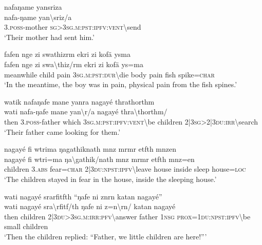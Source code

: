 \ea\label{ex:9:a2302}
nafaŋame yansriza\\
\gll nafa-ŋame	yan{\textbackslash}sriz/a\\
     3.\textsc{poss}-mother	\textsc{sg}>3\textsc{sg}.\textsc{m}:\textsc{pst}:\textsc{ipfv}:\textsc{vent}{\textbackslash}send\\
\glt `Their mother had sent him.'
\z

\ea\label{ex:9:a2303}
fafen nge zi swathizrm ekri zi kofä ysma\\
\gll fafen	nge	zi	swa{\textbackslash}thiz/rm	ekri	zi	kofä	ys=ma\\
     meanwhile	child	pain	3\textsc{sg}.\textsc{m}:\textsc{pst}:\textsc{dur}{\textbackslash}die	body	pain	fish	spike=\textsc{char}\\
\glt `In the meantime, the boy was in pain, physical pain from the fish spines.'
\z

\ea\label{ex:9:a2307}
watik nafaŋafe mane yanra nagayé thrathorthm\\
\gll wati	nafa-ŋafe	mane	yan{\textbackslash}r/a	nagayé	thra{\textbackslash}thorthm/\\
     then	3.\textsc{poss}-father	which	3\textsc{sg}.\textsc{m}:\textsc{pst}:\textsc{ipfv}:\textsc{vent}{\textbackslash}be	children	2|3\textsc{sg}>2|3\textsc{du}:\textsc{irr}{\textbackslash}search\\
\glt `Their father came looking for them.'
\z

\ea\label{ex:9:a4923}
nagayé fi wtrima ŋagathiknath mnz mrmr etfth mnzen\\
\gll nagayé	fi	wtri=ma	ŋa{\textbackslash}gathik/nath	mnz	mrmr	etfth	mnz=en\\
     children	3.\textsc{abs}	fear=\textsc{char}	2|3\textsc{du}:\textsc{npst}:\textsc{ipfv}{\textbackslash}leave	house	inside	sleep	house=\textsc{loc}\\
\glt `The children stayed in fear in the house, inside the sleeping house.'
\z

\ea\label{ex:9:a2311}
wati nagayé srarfitfth ``ŋafe ni znrn katan nagayé''\\
\gll wati	nagayé	sra{\textbackslash}rfitf/th	ŋafe	ni	z=n{\textbackslash}rn/	katan	nagayé\\
     then	children	2|3\textsc{du}>3\textsc{sg}.\textsc{m}:\textsc{irr}:\textsc{pfv}{\textbackslash}answer	father	1\textsc{nsg}	\textsc{prox}=1\textsc{du}:\textsc{npst}:\textsc{ipfv}{\textbackslash}be	small	children\\
\glt `Then the children replied: ``Father, we little children are here!'''
\z

